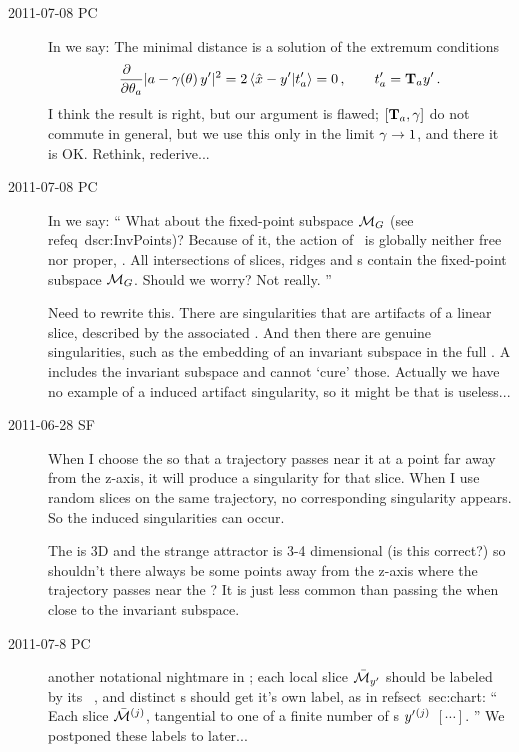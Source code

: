 \begin{description}
\item[2011-07-08 PC]
In  we say: The minimal distance is a solution of the
extremum conditions
\[ %
\frac{\partial ~~}{\partial \gSpace_a} |\ssp - \LieEl(\gSpace)\,\slicep|^2
   =
2\, \braket{\sspRed - \slicep}{\sliceTan{a}}
   = 0
    \,,\qquad
	  \sliceTan{a} = \Lg_a \slicep
\,.
\] %
I think the result is right, but our argument is flawed; $[\mathbf{T}_a,\gamma]$
do not commute in general, but we use this only in the limit $\gamma \to
1$, and there it is OK. Rethink, rederive...

\item[2011-07-08 PC]
In  we say:
``
What about the fixed-point subspace ${\cal M}_{G}$ (see  refeq~{dscr:InvPoints})?
Because of it, the action of \Group\ is globally neither free nor proper,
\etc. All intersections of slices, ridges and {\sset s} contain the
fixed-point subspace ${\cal M}_{G}$. Should we worry? Not really.
''

Need to rewrite this. There are singularities that are artifacts of a
linear slice, described by the associated {\sset}. And then there are
genuine singularities, such as the embedding of an invariant subspace in
the full \statesp. A {\sset} includes the invariant subspace and cannot
`cure' those. Actually we have no example of a {\sset} induced artifact
singularity, so it might be that {\sset} is useless...

\item[2011-06-28 SF]
When I choose the {\sset} so that a trajectory passes near it at a point
far away from the z-axis, it will produce a singularity for that slice.
When I use random slices on the same trajectory, no corresponding
singularity appears. So the {\sset} induced singularities can occur.

The {\sset} is 3D and the strange attractor is 3-4 dimensional (is this
correct?) so shouldn't there always be some points away from the z-axis
where the trajectory passes near the {\sset}? It is just less common than
passing the {\sset} when close to the invariant subspace.

\item[2011-07-8 PC]
another notational nightmare in ; each local slice
$\bar{\cal M}_{{y'}} $ should be labeled by its \template\ \slicep, and
distinct \template s should get it's own label, as in
 refsect~{sec:chart}:
``
Each slice $\bar{\cal M}{}^{(j)}$, tangential to one of a finite number of
{\template s}  ${y'}{}^{(j)}$ $[\cdots]$.
''
We postponed these labels to later...


\end{description}
